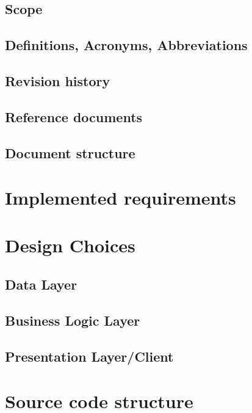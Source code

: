 \documentclass[a4paper,oneside,11pt]{article}
\begin{document}
        \subsection{Scope}
            
        \subsection{Definitions, Acronyms, Abbreviations}
            
        \subsection{Revision history}
        \subsection{Reference documents}
            
        \subsection{Document structure}
        
    

\newpage
    \section{Implemented requirements}
    
    
\newpage

    \section{Design Choices}
    \subsection{Data Layer}
    
    \subsection{Business Logic Layer}
    
    \subsection{Presentation Layer/Client}
    
    
\newpage
    \section{Source code structure}
    
    
\end{document}
